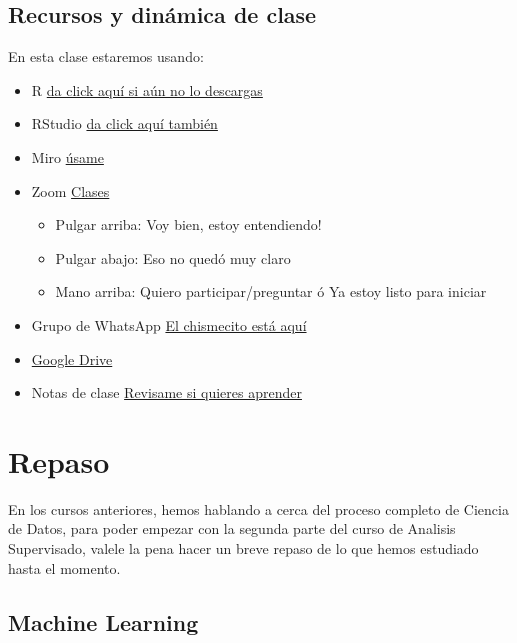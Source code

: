 \documentclass[
]{book}
\providecommand{\tightlist}{%
  \setlength{\itemsep}{0pt}\setlength{\parskip}{0pt}}
\begin{document}
\hypertarget{recursos-y-dinuxe1mica-de-clase}{%
\section{Recursos y dinámica de clase}\label{recursos-y-dinuxe1mica-de-clase}}

En esta clase estaremos usando:

\begin{itemize}
\tightlist
\item
  R \href{https://cran.r-project.org/}{da click aquí si aún no lo descargas}
\item
  RStudio \href{https://www.rstudio.com/products/rstudio/download/}{da click aquí también}
\item
  Miro \href{https://miro.com/welcomeonboard/c3huendzNURhRUVGbHlsWGVFYlBBMXRaSncybXRrbjBRU2R5WWg2eDFKUXY1VlJ1SGJFdmc4ZmRuWEgwcllpenwzMDc0NDU3MzYxMzQwNDIyODEy?invite_link_id=152058640259}{úsame}
\item
  Zoom \href{https://us02web.zoom.us/j/5155440751?pwd=YzJCOGF0VnlZdlZlS0Fpc3MvZEhadz09}{Clases}

  \begin{itemize}
  \tightlist
  \item
    Pulgar arriba: Voy bien, estoy entendiendo!
  \item
    Pulgar abajo: Eso no quedó muy claro
  \item
    Mano arriba: Quiero participar/preguntar ó Ya estoy listo para iniciar
  \end{itemize}
\item
  Grupo de WhatsApp \href{}{El chismecito está aquí}
\item
  \href{}{Google Drive}
\item
  Notas de clase \href{https://acturio.github.io/amt22_03intro2mls2/}{Revisame si quieres aprender}
\end{itemize}

\hypertarget{repaso}{%
\chapter{Repaso}\label{repaso}}

En los cursos anteriores, hemos hablando a cerca del proceso completo de Ciencia de Datos, para poder empezar con la segunda parte del curso de Analisis Supervisado, valele la pena hacer un breve repaso de lo que hemos estudiado hasta el momento.

\hypertarget{machine-learning}{%
\section{Machine Learning}\label{machine-learning}}
\end{document}
